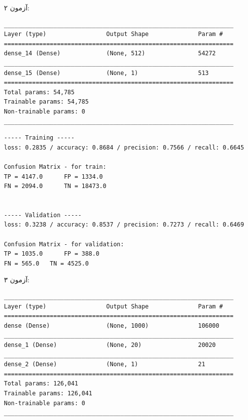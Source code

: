 \documentclass{article}
\begin{document}
\bigbreak

آزمون ۲:

\begin{latin}
\begin{lstlisting}
_________________________________________________________________
Layer (type)                 Output Shape              Param #   
=================================================================
dense_14 (Dense)             (None, 512)               54272     
_________________________________________________________________
dense_15 (Dense)             (None, 1)                 513       
=================================================================
Total params: 54,785
Trainable params: 54,785
Non-trainable params: 0
_________________________________________________________________
\end{lstlisting}
\end{latin}

\begin{latin}
\begin{lstlisting}
----- Training -----
loss: 0.2835 / accuracy: 0.8684 / precision: 0.7566 / recall: 0.6645

Confusion Matrix - for train:
TP = 4147.0 	 FP = 1334.0
FN = 2094.0 	 TN = 18473.0


----- Validation -----
loss: 0.3238 / accuracy: 0.8537 / precision: 0.7273 / recall: 0.6469

Confusion Matrix - for validation:
TP = 1035.0 	 FP = 388.0
FN = 565.0 	 TN = 4525.0
\end{lstlisting}
\end{latin}

\bigbreak


آزمون ۳:

\begin{latin}
\begin{lstlisting}
_________________________________________________________________
Layer (type)                 Output Shape              Param #   
=================================================================
dense (Dense)                (None, 1000)              106000    
_________________________________________________________________
dense_1 (Dense)              (None, 20)                20020     
_________________________________________________________________
dense_2 (Dense)              (None, 1)                 21        
=================================================================
Total params: 126,041
Trainable params: 126,041
Non-trainable params: 0
_________________________________________________________________
\end{lstlisting}
\end{latin}
\end{document}
